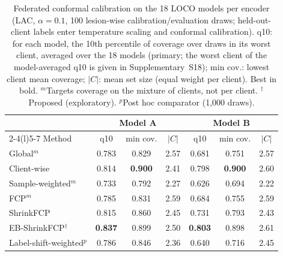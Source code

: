 \begin{table}[!t]
\centering
\caption{Federated conformal calibration on the 18 LOCO models per encoder (LAC, $\alpha=0.1$, 100
lesion-wise calibration/evaluation draws; held-out-client labels enter temperature scaling and conformal
calibration). q10: for each model, the 10th percentile of coverage over draws in its worst client, averaged
over the 18 models (primary; the worst client of the model-averaged q10 is given in Supplementary~S18);
min cov.: lowest client mean coverage; $|C|$: mean set size (equal weight
per client). Best in bold. $^m$Targets coverage on the mixture of clients, not per client.
$^\dagger$Proposed (exploratory). $^p$Post hoc comparator (1,000 draws).}
\label{tab:conformal}
\setlength{\tabcolsep}{2.6pt}
\begin{tabular}{@{}lcccccc@{}}
\toprule
 & \multicolumn{3}{c}{Model A} & \multicolumn{3}{c}{Model B} \\
\cmidrule(lr){2-4}\cmidrule(l){5-7}
Method & q10 & min cov. & $|C|$ & q10 & min cov. & $|C|$ \\
\midrule
Global$^m$ & 0.783 & 0.829 & 2.57 & 0.681 & 0.751 & 2.57 \\
Client-wise & 0.814 & \textbf{0.900} & 2.41 & 0.798 & \textbf{0.900} & 2.60 \\
Sample-weighted$^m$ & 0.733 & 0.792 & 2.27 & 0.626 & 0.694 & 2.22 \\
FCP$^m$ & 0.785 & 0.831 & 2.59 & 0.684 & 0.755 & 2.59 \\
ShrinkFCP & 0.815 & 0.860 & 2.45 & 0.731 & 0.793 & 2.43 \\
EB-ShrinkFCP$^\dagger$ & \textbf{0.837} & 0.899 & 2.50 & \textbf{0.803} & 0.898 & 2.61 \\
Label-shift-weighted$^p$ & 0.786 & 0.846 & 2.36 & 0.640 & 0.716 & 2.45 \\
\bottomrule
\end{tabular}
\end{table}
